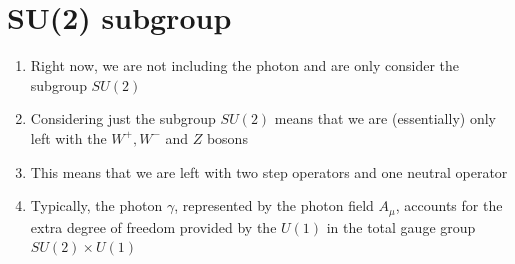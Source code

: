\documentclass[12pt]{article}
\numberwithin{figure}{section}
\numberwithin{table}{section}
\begin{document}
\section{SU(2) subgroup}
\begin{enumerate}
    \item Right now, we are not including the photon and are only consider the subgroup $SU(2)$
    \item Considering just the subgroup $SU(2)$ means that we are (essentially) only left with the $W^+,W^-$ and $Z$ bosons
    \item This means that we are left with two step operators and one neutral operator
    \item Typically, the photon $\gamma$, represented by the photon field $A_\mu$, accounts for the extra degree of freedom provided by the $U(1)$ in the total gauge group $SU(2)\times U(1)$
\end{enumerate}
\end{document}

